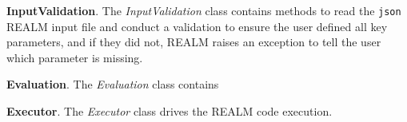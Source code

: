 \vspace{0.2cm} 
\noindent
\textbf{InputValidation}. The \textit{InputValidation} class contains methods 
to read the \texttt{json} \gls{REALM} input file and conduct a validation to 
ensure the user defined all key parameters, and if they did not, \gls{REALM} 
raises an exception to tell the user which parameter is missing. 

\vspace{0.2cm} 
\noindent
\textbf{Evaluation}. The \textit{Evaluation} class contains 

\vspace{0.2cm} 
\noindent
\textbf{Executor}. The \textit{Executor} class drives the \gls{REALM} code
execution. 
